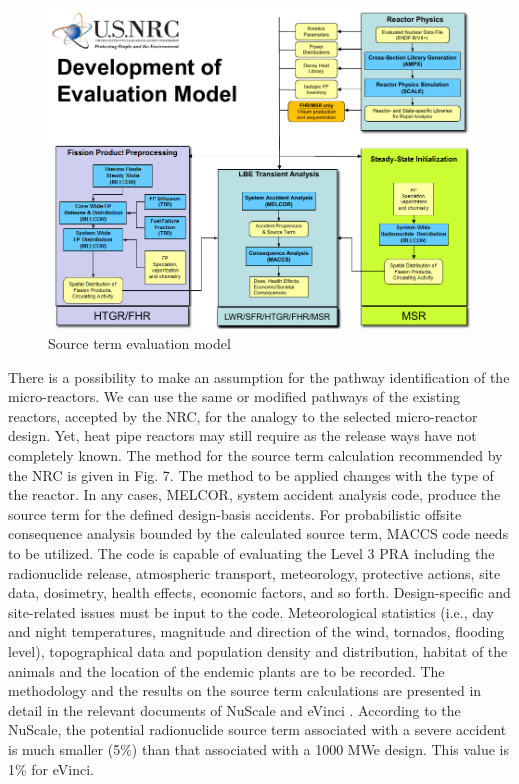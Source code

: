 \documentclass[10pt,a4paper]{article}
\begin{document}
\begin{figure}[hbtp]
\centering
\includegraphics[scale=0.6]{Figs/fig7.jpeg}
\caption{Source term evaluation model}
\end{figure}

There is a possibility to make an assumption for the pathway identification of the micro-reactors. We can use the same or modified pathways of the existing reactors, accepted by the NRC, for the analogy to the selected micro-reactor design. Yet, heat pipe reactors may still require as the release ways have not completely known.
The method for the source term calculation recommended by the NRC is given in Fig. 7. The method to be applied changes with the type of the reactor. In any cases, MELCOR, system accident analysis code, produce the source term for the defined design-basis accidents. 
For probabilistic offsite consequence analysis bounded by the calculated source term, MACCS code needs to be utilized. The code is capable of evaluating the Level 3 PRA including the radionuclide release, atmospheric transport, meteorology, protective actions, site data, dosimetry, health effects, economic factors, and so forth. Design-specific and site-related issues must be input to the code.  Meteorological statistics (i.e., day and night temperatures, magnitude and direction of the wind, tornados, flooding level), topographical data and population density and distribution, habitat of the animals and the location of the endemic plants are to be recorded.   
The methodology and the results on the source term calculations are presented in detail in the relevant documents of NuScale \cite{NuScale18} and eVinci \cite{Southern19}.
According to the NuScale, the potential radionuclide source term associated with a severe accident is much smaller (5\%) than that associated with a 1000 MWe design. This value is 1\% for eVinci. 
\end{document}
